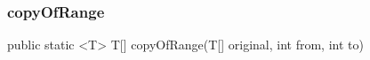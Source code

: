\documentclass[12pt, landscape, a4paper]{article}
\newenvironment{itemize*}
{\begin{itemize}\setlength{\itemsep}{0pt}}{\end{itemize}}
\newcommand{\cmnt}[1]{{\addfontfeature{Numbers=OldStyle} \sffamily\footnotesize #1}}
\begin{document}
\begin{multicols*}{3}
\subsubsection{copyOfRange}
\begin{itemize*}
	\item public static <T> T[] copyOfRange(T[] original, int from, int to)
\end{itemize*}	
	


















































\end{multicols*}
\end{document}

